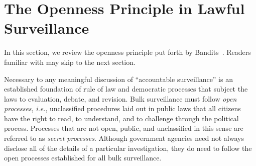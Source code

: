 \section{The Openness Principle in Lawful Surveillance}\label{sec-open}
In this section, we review the openness principle put forth by
Bandits~\cite{sff-foci2014}.  Readers familiar with \cite{sff-foci2014} 
may skip to the next section.

Necessary to any meaningful discussion of ``accountable surveillance'' is an
established foundation of rule of law and democratic processes that subject
the laws to evaluation, debate, and revision.  Bulk surveillance must follow
{\it open processes}, {\it i.e.}, unclassified procedures laid out in public 
laws that all citizens have the right to read, to understand, and to challenge
through the political process.  Processes that are not open, public, and
unclassified in this sense are referred to as {\it secret processes}.  
Although government agencies need not always disclose all of the details of a 
particular investigation, they do need to follow the open processes 
established for all bulk surveillance.

